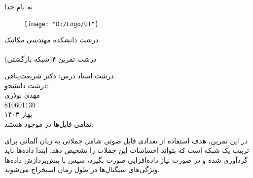 \documentclass[11pt]{article}
\begin{document}
	به نام خدا\\
	\vspace{1cm}
	\begin{figure}[h]
		\begin{center}
			\texttt{[image: "D:/Logo/UT"]}
		\end{center}
	\end{figure}
	{‌درشت دانشکده مهندسی مکانیک}\\
	\vspace{1cm}
	{ }\\
	
	\vspace{0.5cm}
	{‌درشت تمرین ۴(شبکه بازگشتی)}
	\vspace{1.5cm}
	
	\vspace{1.5cm}
	{‌درشت { استاد درس:} دکتر شریعت‌پناهی}\\
	\vspace{2cm}
	{‌درشت { دانشجو:}}\\
	{ مهدی نوذری\\
	810601139}\\
	\vspace{3cm}
	بهار ۱۴۰۳\\
	\pagebreak
		تمامی فایل‌ها در  موجود هستند:
	\href{https://github.com/Morphit/UT_AI_1403}{}
	
	\vspace{1cm}
	در این تمرین، هدف استفاده از تعدادی فایل صوتی شامل جملاتی به زبان آلمانی برای تربیت یک شبکه است که بتواند احساسات این جملات را تشخیص دهد. ابتدا داده‌ها باید گردآوری شده و در صورت نیاز داده‌افزایی صورت بگیرد،‌ سپس با پیش‌پردازش داده‌ها ویژگی‌های سیگنال‌ها در طول زمان استخراج می‌شوند.
\end{document}

